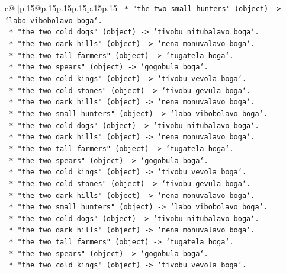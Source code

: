 \documentclass{article}
\begin{document}
{\begin{supertabular}{c@{$\;$}|p{.15\linewidth}@{}p{.15\linewidth}p{.15\linewidth}p{.15\linewidth}p{.15\linewidth}p{.15\linewidth}}
{{{\texttt{        *   "the two small hunters" (object) {-}> `labo vibobolavo boga`.} \\
\texttt{        *   "the two cold dogs" (object) {-}> `tivobu nitubalavo boga`.} \\
\texttt{        *   "the two dark hills" (object) {-}> `nena monuvalavo boga`.} \\
\texttt{        *   "the two tall farmers" (object) {-}> `tugatela boga`.} \\
\texttt{        *   "the two spears" (object) {-}> `gogobula boga`.} \\
\texttt{        *   "the two cold kings" (object) {-}> `tivobu vevola boga`.} \\
\texttt{        *   "the two cold stones" (object) {-}> `tivobu gevula boga`.} \\
\texttt{        *   "the two dark hills" (object) {-}> `nena monuvalavo boga`.} \\
\texttt{        *   "the two small hunters" (object) {-}> `labo vibobolavo boga`.} \\
\texttt{        *   "the two cold dogs" (object) {-}> `tivobu nitubalavo boga`.} \\
\texttt{        *   "the two dark hills" (object) {-}> `nena monuvalavo boga`.} \\
\texttt{        *   "the two tall farmers" (object) {-}> `tugatela boga`.} \\
\texttt{        *   "the two spears" (object) {-}> `gogobula boga`.} \\
\texttt{        *   "the two cold kings" (object) {-}> `tivobu vevola boga`.} \\
\texttt{        *   "the two cold stones" (object) {-}> `tivobu gevula boga`.} \\
\texttt{        *   "the two dark hills" (object) {-}> `nena monuvalavo boga`.} \\
\texttt{        *   "the two small hunters" (object) {-}> `labo vibobolavo boga`.} \\
\texttt{        *   "the two cold dogs" (object) {-}> `tivobu nitubalavo boga`.} \\
\texttt{        *   "the two dark hills" (object) {-}> `nena monuvalavo boga`.} \\
\texttt{        *   "the two tall farmers" (object) {-}> `tugatela boga`.} \\
\texttt{        *   "the two spears" (object) {-}> `gogobula boga`.} \\
\texttt{        *   "the two cold kings" (object) {-}> `tivobu vevola boga`.} \\
}}}
\end{supertabular}}
\end{document}
